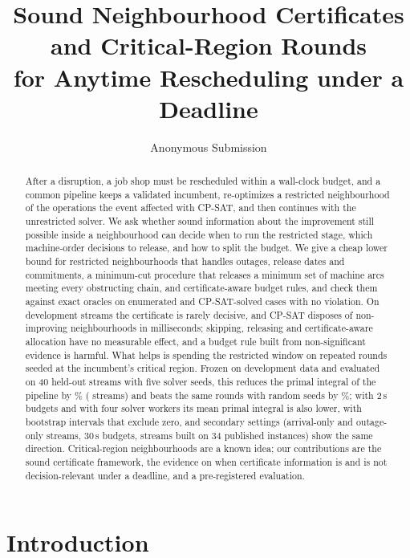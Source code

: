 \documentclass[letterpaper]{article} %
\title{Sound Neighbourhood Certificates and Critical-Region Rounds\\for Anytime Rescheduling under a Deadline}
\author{
    Anonymous Submission
}
\begin{document}
\maketitle

\begin{abstract}
After a disruption, a job shop must be rescheduled within a wall-clock budget, and a common pipeline keeps a validated incumbent, re-optimizes a restricted neighbourhood of the operations the event affected with CP-SAT, and then continues with the unrestricted solver. We ask whether sound information about the improvement still possible inside a neighbourhood can decide when to run the restricted stage, which machine-order decisions to release, and how to split the budget. We give a cheap lower bound for restricted neighbourhoods that handles outages, release dates and commitments, a minimum-cut procedure that releases a minimum set of machine arcs meeting every obstructing chain, and certificate-aware budget rules, and check them against exact oracles on \OracleEnumCases{} enumerated and \OracleCpsatCases{} CP-SAT-solved cases with no violation. On development streams the certificate is rarely decisive, and CP-SAT disposes of non-improving neighbourhoods in milliseconds; skipping, releasing and certificate-aware allocation have no measurable effect, and a budget rule built from non-significant evidence is harmful. What helps is spending the restricted window on repeated rounds seeded at the incumbent's critical region. Frozen on development data and evaluated on 40 held-out streams with five solver seeds, this reduces the primal integral of the pipeline by \SOneCandidateVsIaipSrRel\% (\SOneCandidateVsIaipSrWL{} streams) and beats the same rounds with random seeds by \SOneCandidateVsRandomRoundsRel\%; with 2\,s budgets and with four solver workers its mean primal integral is also lower, with bootstrap intervals that exclude zero, and secondary settings (arrival-only and outage-only streams, 30\,s budgets, streams built on 34 published instances) show the same direction. Critical-region neighbourhoods are a known idea; our contributions are the sound certificate framework, the evidence on when certificate information is and is not decision-relevant under a deadline, and a pre-registered evaluation.
\end{abstract}

\section{Introduction}
\end{document}
